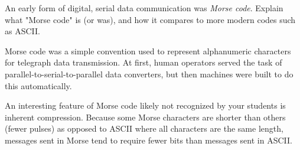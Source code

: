 

An early form of digital, serial data communication was {\it Morse code}.  Explain what "Morse code" is (or was), and how it compares to more modern codes such as ASCII.







Morse code was a simple convention used to represent alphanumeric characters for telegraph data transmission.  At first, human operators served the task of parallel-to-serial-to-parallel data converters, but then machines were built to do this automatically.







An interesting feature of Morse code likely not recognized by your students is inherent compression.  Because some Morse characters are shorter than others (fewer pulses) as opposed to ASCII where all characters are the same length, messages sent in Morse tend to require fewer bits than messages sent in ASCII.




